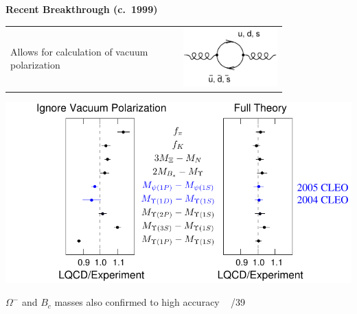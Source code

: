 \documentclass[landscape]{article}
\newenvironment{slide}[1][ ]{}{\mbox{ } \hfill \arabic{page}/39 \pagebreak}
\begin{document}

\begin{slide}
{\Huge \bf Recent Breakthrough (c.\ 1999)}

\vfill
\begin{tabular}{p{0.5\linewidth} p{0.3\linewidth}}
\begin{minipage}{\linewidth}
Allows for calculation of vacuum polarization
\end{minipage} &
\begin{minipage}{\linewidth}
\includegraphics[height=3.5 cm]{vacuum_polarization}
\end{minipage}
\end{tabular}

\vfill
\begin{center}
\includegraphics[width=0.85\linewidth]{lqcd_success}
\end{center}

\vfill
$\Omega^-$ and $B_c$ masses also confirmed to high accuracy
\end{slide}

\end{document}
